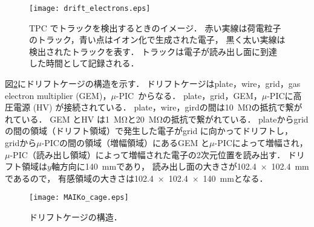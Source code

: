 \documentclass[../master]{subfiles}
\begin{document}
\begin{figure}
  \centering
  \texttt{[image: drift\_electrons.eps]}
  \caption{TPC でトラックを検出するときのイメージ．
    赤い実線は荷電粒子のトラック，青い点はイオン化で生成された電子，
    黒く太い実線は検出されたトラックを表す．
    トラックは電子が読み出し面に到達した時間として記録される．}
  \label{fig::drift_electrons}
\end{figure}

図\ref{fig::MAIKo_cage}にドリフトケージの構造を示す．
ドリフトケージはplate，wire，grid，gas electron multiplier (GEM)，$\mu$-PIC~\cite{mupic}からなる．
plate，grid，GEM，$\mu$-PICに高圧電源 (HV) が接続されている．
plate，wire，girdの間は\SI{10}{\mega\ohm}の抵抗で繋がれている．
GEM とHV は\SI{1}{\mega\ohm}と\SI{20}{\mega\ohm}の抵抗で繋がれている．
plateからgridの間の領域（ドリフト領域）で発生した電子がgrid に向かってドリフトし，
gridから$\mu$-PICの間の領域（増幅領域）にあるGEM と$\mu$-PICによって増幅され，
$\mu$-PIC（読み出し領域）によって増幅された電子の2次元位置を読み出す．
ドリフト領域は$y$軸方向に\SI{140}{\milli\metre}であり，
読み出し面の大きさが\SI{102.4x102.4}{\milli\metre}であるので，
有感領域の大きさは\SI{102.4x102.4x140}{\milli\metre}となる．
\begin{figure}
  \centering
  \texttt{[image: MAIKo\_cage.eps]}
  \caption{ドリフトケージの構造．}
  \label{fig::MAIKo_cage}
\end{figure}

\end{document}
